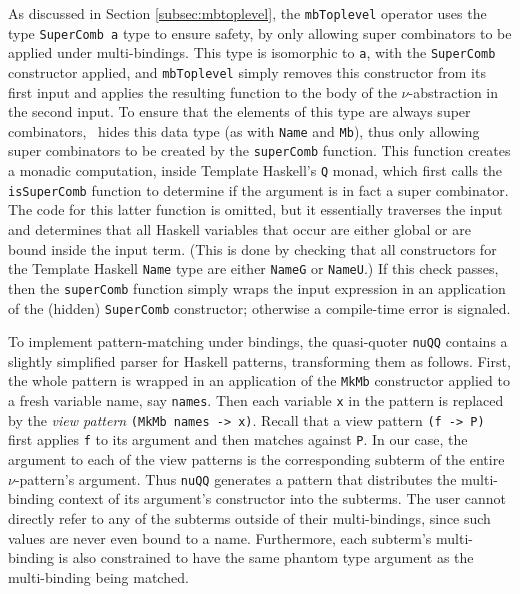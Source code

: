 \documentclass[natbib]{sigplanconf}
\begin{document}
As discussed in Section \ref{subsec:mbtoplevel}, the
\lstinline{mbToplevel} operator uses the type \lstinline{SuperComb a}
type to ensure safety, by only allowing super combinators to be
applied under multi-bindings. This type is isomorphic to
\lstinline{a}, with the \lstinline{SuperComb} constructor applied, and
\lstinline{mbToplevel} simply removes this constructor from its first
input and applies the resulting function to the body of the
$\nu$-abstraction in the second input. To ensure that the elements of
this type are always super combinators, \ourlib\ hides this data type
(as with \lstinline{Name} and \lstinline{Mb}), thus only allowing
super combinators to be created by the \lstinline{superComb}
function. This function creates a monadic computation, inside Template
Haskell's \lstinline{Q} monad, which first calls the
\lstinline{isSuperComb} function to determine if the argument is in
fact a super combinator. The code for this latter function is omitted,
but it essentially traverses the input and determines that all Haskell
variables that occur are either global or are bound inside the input
term.  (This is done by checking that all constructors for the
Template Haskell \lstinline{Name} type are either \lstinline{NameG} or
\lstinline{NameU}.) If this check passes, then the
\lstinline{superComb} function simply wraps the input expression in an
application of the (hidden) \lstinline{SuperComb} constructor;
otherwise a compile-time error is signaled.

To implement pattern-matching under bindings, the quasi-quoter
\lstinline{nuQQ} contains a slightly simplified parser for Haskell
patterns, transforming them as follows. First, the whole pattern is
wrapped in an application of the \lstinline{MkMb} constructor applied
to a fresh variable name, say \lstinline{names}. Then each variable
\lstinline{x} in the pattern is replaced by the \emph{view pattern}
\lstinline{(MkMb names -> x)}. Recall that a view pattern
\lstinline{(f -> P)} first applies \lstinline{f} to its argument and
then matches against \lstinline{P}. In our case, the argument to each
of the view patterns is the corresponding subterm of the entire
$\nu$-pattern's argument. Thus \lstinline{nuQQ} generates a pattern
that distributes the multi-binding context of its argument's
constructor into the subterms. The user cannot directly refer to any
of the subterms outside of their multi-bindings, since such values are
never even bound to a name. Furthermore, each subterm's multi-binding
is also constrained to have the same phantom type argument as the
multi-binding being matched.
\end{document}
